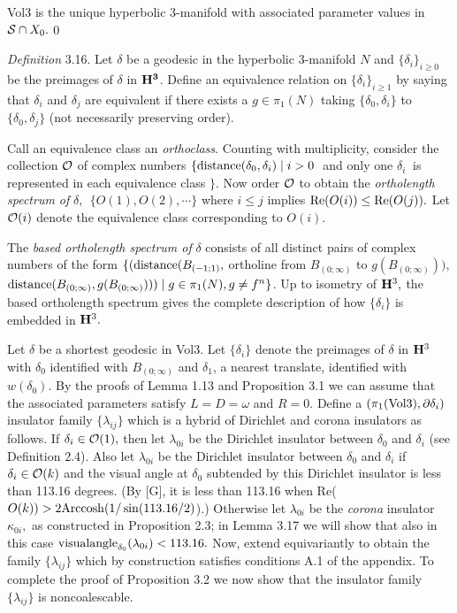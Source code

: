  {\rm Vol3} is the unique hyperbolic $3$\/{\rm -}\/manifold with
associated parameter values in  ${\cal S} \cap X_0.$\hfill\qed
\endproclaim

{\it Definition} 3.16. Let $\delta$ be a geodesic in the hyperbolic 3-manifold $N$
and $\{\delta_i\}_{i\ge 0}$ be the preimages of $\delta$ in ${\bf H^3}$.  Define an
equivalence relation on $\{\delta_i\}_{i\ge 1}$ by saying that $\delta_i$ and $\delta_j$ are equivalent if
there exists a $g\in\pi_1(N)$ taking $\{\delta_0,\delta_i\}$ to
$\{\delta_0,\delta_j\}$
(not necessarily preserving order).

Call an equivalence class an {\it orthoclass}.   Counting
with multiplicity,  consider the collection
$\cal O$ of complex numbers 
$\{\distance(\delta_0, \delta_i)\mid i>0\ $ and only one
$\delta_i\ $ is represented in each equivalence class $\}.$  
Now order $\cal O$ to obtain
the {\it ortholength spectrum of} $\delta, \ \ \{O(1), O(2), \cdots\}$ where $i\le j$ implies
${\rm Re}(O(i))\le {\rm Re}(O(j)).$
Let ${\cal O}(i)$ denote the equivalence class corresponding to $O(i).$

The {\it based ortholength spectrum of} $\delta$
consists of all distinct pairs of complex
numbers of the form $\{({\rm distance}(B_{(-1;1)}, $ ortholine from $ B_{(0;\infty)}$ to
$g(B_{(0;\infty)}))$, ${\rm distance}(B_{(0;\infty)},g(B_{(0;\infty)})))\mid g\in \pi_1(N), g \ne f^n\}$.
Up to isometry of ${\bf H}^3,$ the
based ortholength spectrum gives the complete description of how $\{\delta_i\}$ is embedded in ${\bf H}^3.$

Let $\delta$ be a shortest geodesic in Vol3. Let
$\{\delta_i\}$ denote the preimages of $\delta$ in ${\bf H}^3$ with $\delta_0$ identified
with $B_{(0;\infty)}$  and $\delta_1$, a nearest translate, identified with $w(\delta_0).$ By
the proofs of Lemma 1.13 and Proposition 3.1 we can assume that the
associated parameters satisfy $L=D=\omega$ and $R=0.$  Define a
$(\pi_1({\rm Vol3}),{\partial \delta_i})$ 
insulator family $\{\lambda_{ij}\}$ which is a hybrid of
Dirichlet and corona insulators as follows.  
If $\delta_i\in {\cal O}(1),$ then
let $\lambda_{0i}$ be the Dirichlet insulator between $\delta_0$ and $\delta_i$
(see Definition 2.4).  Also let $\lambda_{0i}$ be the Dirichlet insulator between $\delta_0$ and $\delta_i$
if $\delta_i\in {\cal O}(k)$ and the 
visual angle at $\delta_0$ subtended by this Dirichlet insulator is
less than 113.16 degrees.
 (By [G], it is less than 113.16 when Re($O(k))>2 {\rm Arccosh}(1/\sin(113.16/2)$).)
Otherwise let  $\lambda_{0i}$ be the {\it corona} insulator 
$\kappa_{0i},$ as constructed in Proposition 2.3;  
in Lemma 3.17 we will show that also in this case ${\rm visualangle}_{\delta_0}(\lambda_{0i}) < 113.16.$
Now, extend equivariantly to
obtain the family $\{\lambda_{ij}\}$ which by construction satisfies conditions
A.1 of the appendix.   
To complete the proof of
Proposition 3.2 we now show that the insulator family $\{\lambda_{ij}\}$ is noncoalescable.

